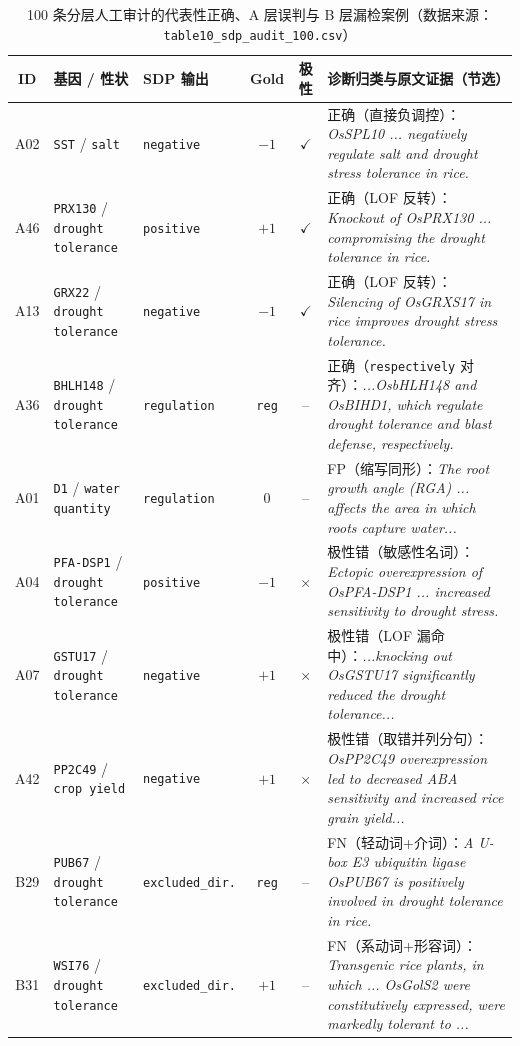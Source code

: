 \documentclass[conference]{IEEEtran}
\begin{document}
\begin{table}[t]
  \centering
  \scriptsize
  \renewcommand{\arraystretch}{1.04}
  \setlength{\tabcolsep}{3.5pt}
  \caption{100 条分层人工审计的代表性正确、A 层误判与 B 层漏检案例（数据来源：\texttt{table10\_sdp\_audit\_100.csv}）}
  \label{tab:audit_cases}
  \begin{tabularx}{\textwidth}{@{}c l l c c X@{}}
    \toprule
    ID & 基因 / 性状 & SDP 输出 & Gold & 极性 & 诊断归类与原文证据（节选） \\
    \midrule
    A02 & \texttt{SST} / \texttt{salt} & \texttt{negative} & $-1$ & $\checkmark$ & 正确（直接负调控）：\textit{OsSPL10 ... negatively regulate salt and drought stress tolerance in rice.} \\
    A46 & \texttt{PRX130} / \texttt{drought tolerance} & \texttt{positive} & $+1$ & $\checkmark$ & 正确（LOF 反转）：\textit{Knockout of OsPRX130 ... compromising the drought tolerance in rice.} \\
    A13 & \texttt{GRX22} / \texttt{drought tolerance} & \texttt{negative} & $-1$ & $\checkmark$ & 正确（LOF 反转）：\textit{Silencing of OsGRXS17 in rice improves drought stress tolerance.} \\
    A36 & \texttt{BHLH148} / \texttt{drought tolerance} & \texttt{regulation} & \texttt{reg} & -- & 正确（\texttt{respectively} 对齐）：\textit{...OsbHLH148 and OsBIHD1, which regulate drought tolerance and blast defense, respectively.} \\
    A01 & \texttt{D1} / \texttt{water quantity} & \texttt{regulation} & $0$ & -- & FP（缩写同形）：\textit{The root growth angle (RGA) ... affects the area in which roots capture water...} \\
    A04 & \texttt{PFA-DSP1} / \texttt{drought tolerance} & \texttt{positive} & $-1$ & $\times$ & 极性错（敏感性名词）：\textit{Ectopic overexpression of OsPFA-DSP1 ... increased sensitivity to drought stress.} \\
    A07 & \texttt{GSTU17} / \texttt{drought tolerance} & \texttt{negative} & $+1$ & $\times$ & 极性错（LOF 漏命中）：\textit{...knocking out OsGSTU17 significantly reduced the drought tolerance...} \\
    A42 & \texttt{PP2C49} / \texttt{crop yield} & \texttt{negative} & $+1$ & $\times$ & 极性错（取错并列分句）：\textit{OsPP2C49 overexpression led to decreased ABA sensitivity and increased rice grain yield...} \\
    B29 & \texttt{PUB67} / \texttt{drought tolerance} & \texttt{excluded\_dir.} & \texttt{reg} & -- & FN（轻动词+介词）：\textit{A U-box E3 ubiquitin ligase OsPUB67 is positively involved in drought tolerance in rice.} \\
    B31 & \texttt{WSI76} / \texttt{drought tolerance} & \texttt{excluded\_dir.} & $+1$ & -- & FN（系动词+形容词）：\textit{Transgenic rice plants, in which ... OsGolS2 were constitutively expressed, were markedly tolerant to ...} \\
    \bottomrule
  \end{tabularx}
\end{table}
\end{document}
